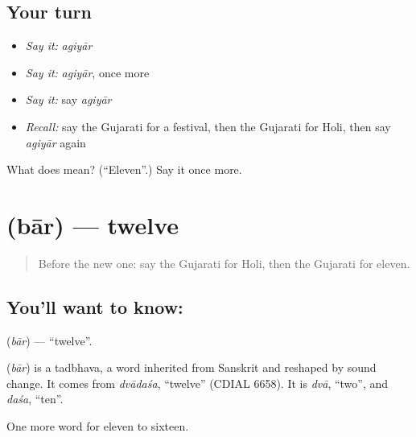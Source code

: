 \subsection*{Your turn}
\begin{itemize}
\raggedright
  \item \emph{Say it:} \emph{agiyār}
  \item \emph{Say it:} \emph{agiyār}, once more
  \item \emph{Say it:} say \emph{agiyār}
  \item \emph{Recall:} say the Gujarati for a festival, then the Gujarati for Holi, then say \emph{agiyār} again
\end{itemize}

\begin{tcolorbox}[breakable,colback=teal!4,colframe=teal!35!black,title={Before you move on}]
What does  mean? (\textquotedblleft{}Eleven\textquotedblright{}.) Say it once more.
\end{tcolorbox}
\section[\texorpdfstring{\gu{બાર} (bār)}{બાર (bār)}]{ (bār) — twelve}

\label{lesson:GU-C81-twelve}



\begin{quote}
Before the new one: say the Gujarati for Holi, then the Gujarati for eleven.
\end{quote}

\subsection*{You'll want to know: }
\textbf{} (\emph{bār}) — \textquotedblleft{}twelve\textquotedblright{}.

\begin{cousinweb}
\textbf{} (\emph{bār}) is a tadbhava, a word inherited from Sanskrit and reshaped by sound change. It comes from \emph{dvādaśa}, \textquotedblleft{}twelve\textquotedblright{} (CDIAL 6658). It is \emph{dvā}, \textquotedblleft{}two\textquotedblright{}, and \emph{daśa}, \textquotedblleft{}ten\textquotedblright{}.
\end{cousinweb}

\begin{grammarlens}[title={What you've built}]
One more word for eleven to sixteen.
\end{grammarlens}

